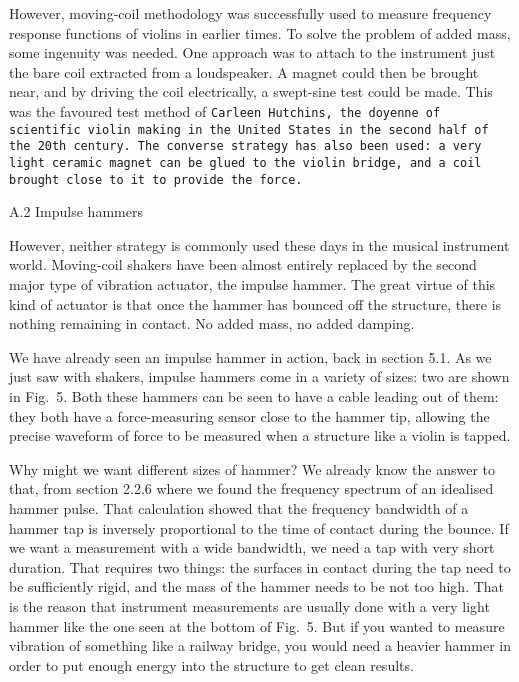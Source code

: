 
  However, moving-coil methodology was successfully used to measure frequency 
  response functions of violins in earlier times. To solve the problem of added 
  mass, some ingenuity was needed. One approach was to attach to the instrument 
  just the bare coil extracted from a loudspeaker. A magnet could then be 
  brought near, and by driving the coil electrically, a swept-sine test could 
  be made. This was the favoured test method of \tt{}Carleen Hutchins\rm{}, the 
  doyenne of scientific violin making in the United States in the second half 
  of the 20th century. The converse strategy has also been used: a very light 
  ceramic magnet can be glued to the violin bridge, and a coil brought close to 
  it to provide the force. 

  A.2 Impulse hammers 

  However, neither strategy is commonly used these days in the musical 
  instrument world. Moving-coil shakers have been almost entirely replaced by 
  the second major type of vibration actuator, the impulse hammer. The great 
  virtue of this kind of actuator is that once the hammer has bounced off the 
  structure, there is nothing remaining in contact. No added mass, no added 
  damping. 

  We have already seen an impulse hammer in action, back in section 5.1. As we 
  just saw with shakers, impulse hammers come in a variety of sizes: two are 
  shown in Fig.\ 5. Both these hammers can be seen to have a cable leading out 
  of them: they both have a force-measuring sensor close to the hammer tip, 
  allowing the precise waveform of force to be measured when a structure like a 
  violin is tapped. 


  Why might we want different sizes of hammer? We already know the answer to 
  that, from section 2.2.6 where we found the frequency spectrum of an 
  idealised hammer pulse. That calculation showed that the frequency bandwidth 
  of a hammer tap is inversely proportional to the time of contact during the 
  bounce. If we want a measurement with a wide bandwidth, we need a tap with 
  very short duration. That requires two things: the surfaces in contact during 
  the tap need to be sufficiently rigid, and the mass of the hammer needs to be 
  not too high. That is the reason that instrument measurements are usually 
  done with a very light hammer like the one seen at the bottom of Fig.\ 5. But 
  if you wanted to measure vibration of something like a railway bridge, you 
  would need a heavier hammer in order to put enough energy into the structure 
  to get clean results. 

